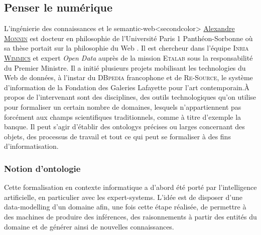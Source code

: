 \subsection[Penser le numérique]{Penser le numérique}
\label{sub:II.4.1}

L'ingénierie des connaissances et le \gls{semantic-web}\caution[t]<secondcolor>{%
\href{http://web-and-philosophy.org/abouta-propos/bio/}{Alexandre \textsc{Monnin}} est docteur en philosophie de l’Université Paris 1 Panthéon-Sorbonne où sa thèse portait sur la philosophie du Web \parencite{Monnin:2013}. Il est chercheur dans l'équipe \textsc{Inria} \href{https://www.inria.fr/fr/liste-des-equipes-projets}{\textsc{Wimmics}} et expert \textit{Open Data} auprès de la mission \textsc{Etalab} sous la responsabilité du Premier Ministre. Il a initié plusieurs projets mobilisant les technologies du Web de données, à l'instar du \textsc{DBpedia} francophone et de \textsc{Re-Source}, le système d'information de la Fondation des Galeries Lafayette pour l'art contemporain.}{À propos de l'intervenant}
 sont des disciplines, des outils technologiques qu'on utilise pour formaliser un certain nombre de domaines, lesquels n'appartiennent pas forcément aux champs scientifiques traditionnels, comme à titre d'exemple la banque. Il peut s'agir d'établir des \glspl{ontology} précises ou larges concernant des objets, des processus de travail et tout ce qui peut se formaliser à des fins d'informatisation.

\subsubsection[Ontologie]{Notion d'ontologie}
\label{subsub:II.4.1.1}



Cette formalisation en contexte informatique a d'abord été porté par l'intelligence artificielle, en particulier avec les \glspl{expert-system}. L'idée est de disposer d'une \gls{data-modelling} d'un domaine afin, une fois cette étape réalisée, de permettre à des machines de produire des inférences, des raisonnements à partir des entités du domaine et de générer ainsi de nouvelles connaissances.

